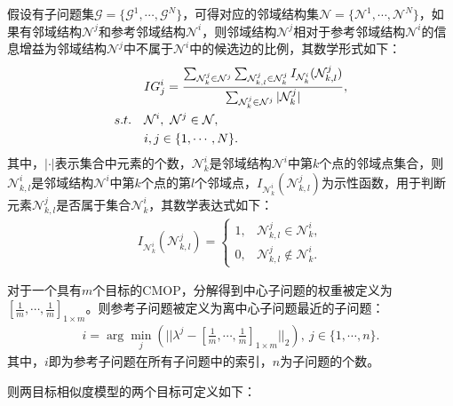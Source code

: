 \begin{definition}
    \label{def:Information Gain}
    假设有子问题集$\mathcal{G} = \{ \mathcal{G}^1, \cdots , \mathcal{G}^N \}$，可得对应的邻域结构集$\mathcal{N} = \{ \mathcal{N}^1, \cdots , \mathcal{N}^N \}$，如果有邻域结构$\mathcal{N}^j$和参考邻域结构$\mathcal{N}^i$，则邻域结构$\mathcal{N}^j$相对于参考邻域结构$\mathcal{N}^i$的信息增益为邻域结构$\mathcal{N}^j$中不属于$\mathcal{N}^i$中的候选边的比例，其数学形式如下：
    \begin{align}
        \label{eq:Information Gain}
        & IG^i_j =  \frac{\sum_{\mathcal{N}^j_k \in \mathcal{N}^j} \sum_{\mathcal{N}^j_{k,l} \in \mathcal{N}^j_k} I_{\mathcal{N}_k^i} (\mathcal{N}_{k,l}^j)}{\sum_{\mathcal{N}^j_k \in \mathcal{N}^j} |\mathcal{N}^j_k|}, \\
        s.t. \quad & \mathcal{N}^i, \ \mathcal{N}^j \in \mathcal{N}, \notag  \\
                   & i,j \in \{ 1, \cdots, N \}. \notag
    \end{align}
    其中，$|\cdot|$表示集合中元素的个数，$\mathcal{N}^i_k$是邻域结构$\mathcal{N}^i$中第$k$个点的邻域点集合，则$\mathcal{N}^i_{k,l}$是邻域结构$\mathcal{N}^i$中第$k$个点的第$l$个邻域点，$I_{\mathcal{N}_k^i} (\mathcal{N}_{k,l}^j)$为示性函数，用于判断元素$\mathcal{N}_{k,l}^j$是否属于集合$\mathcal{N}_k^i$，其数学表达式如下：
    \begin{align}
        \label{eq:示性函数}
        I_{\mathcal{N}_k^i} (\mathcal{N}_{k,l}^j) = 
        \begin{cases}
            1, & \mathcal{N}_{k,l}^j \in \mathcal{N}_k^i,     \\
            0, & \mathcal{N}_{k,l}^j \not \in \mathcal{N}_k^i.
        \end{cases}
    \end{align}
\end{definition}
\begin{definition}
    \label{def:Reference Subproblem}
    对于一个具有$m$个目标的CMOP，分解得到中心子问题的权重被定义为$\left[ \frac{1}{m}, \cdots, \frac{1}{m} \right]_{1 \times m} $。则参考子问题被定义为离中心子问题最近的子问题：
    \begin{align}
        \label{eq:Reference Subproblem}
        i = \arg\min_j(|| \lambda^j - [\frac{1}{m},\cdots,\frac{1}{m}]_{1 \times m} ||_2), \ j \in \{1,\cdots,n\}.
    \end{align}
    其中，$i$即为参考子问题在所有子问题中的索引，$n$为子问题的个数。
\end{definition}
则两目标相似度模型的两个目标可定义如下：
